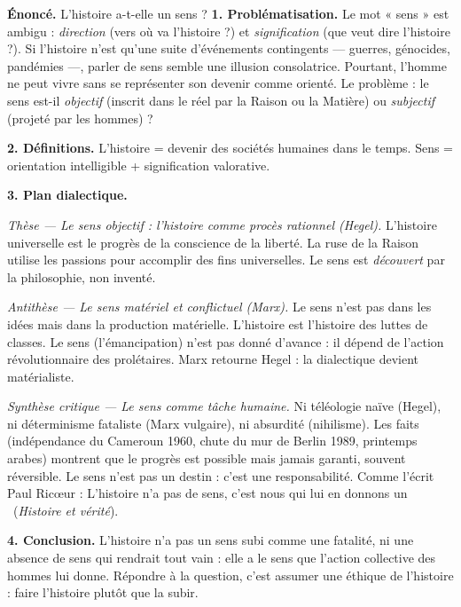\documentclass[11pt]{article}
\newcommand{\cle}[1]{{\popxbold\color{popdark}#1}}
\begin{document}
\begin{exoresolu}
\textbf{Énoncé.} L'histoire a-t-elle un sens ?
\tcblower
\textbf{1. Problématisation.} Le mot « sens » est ambigu : \emph{direction} (vers où va l'histoire ?) et \emph{signification} (que veut dire l'histoire ?). Si l'histoire n'est qu'une suite d'événements contingents — guerres, génocides, pandémies —, parler de sens semble une illusion consolatrice. Pourtant, l'homme ne peut vivre sans se représenter son devenir comme orienté. Le problème : le sens est-il \emph{objectif} (inscrit dans le réel par la Raison ou la Matière) ou \emph{subjectif} (projeté par les hommes) ?

\textbf{2. Définitions.} L'histoire = devenir des sociétés humaines dans le temps. Sens = orientation intelligible + signification valorative.

\textbf{3. Plan dialectique.}

\emph{Thèse — Le sens objectif : l'histoire comme procès rationnel (Hegel).} L'histoire universelle est le progrès de la conscience de la liberté. La \guillemotleft ruse de la Raison \guillemotright utilise les passions pour accomplir des fins universelles. Le sens est \emph{découvert} par la philosophie, non inventé.

\emph{Antithèse — Le sens matériel et conflictuel (Marx).} Le sens n'est pas dans les idées mais dans la production matérielle. L'histoire est l'histoire des luttes de classes. Le sens (l'émancipation) n'est pas donné d'avance : il dépend de l'action révolutionnaire des prolétaires. Marx \guillemotleft retourne \guillemotright Hegel : la dialectique devient matérialiste.

\emph{Synthèse critique — Le sens comme tâche humaine.} Ni téléologie naïve (Hegel), ni déterminisme fataliste (Marx vulgaire), ni absurdité (nihilisme). Les faits (indépendance du Cameroun 1960, chute du mur de Berlin 1989, printemps arabes) montrent que le progrès est possible mais jamais garanti, souvent réversible. Le sens n'est pas un destin : c'est une \cle{responsabilité}. Comme l'écrit Paul Ricœur : \guillemotleft L'histoire n'a pas de sens, c'est nous qui lui en donnons un \guillemotright\ (\emph{Histoire et vérité}).

\textbf{4. Conclusion.} L'histoire n'a pas un sens subi comme une fatalité, ni une absence de sens qui rendrait tout vain : elle a le sens que l'action collective des hommes lui donne. Répondre à la question, c'est assumer une éthique de l'histoire : faire l'histoire plutôt que la subir.
\end{exoresolu}
\end{document}
